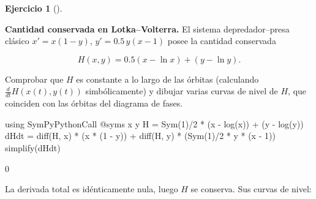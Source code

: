 \documentclass[
  spanish,
  a4paper,
]{scrreport}
\newenvironment{Shaded}{\begin{snugshade}}{\end{snugshade}}
\newcommand{\BuiltInTok}[1]{\textcolor[rgb]{0.00,0.23,0.31}{#1}}
\newcommand{\FloatTok}[1]{\textcolor[rgb]{0.68,0.00,0.00}{#1}}
\newcommand{\FunctionTok}[1]{\textcolor[rgb]{0.28,0.35,0.67}{#1}}
\newcommand{\ImportTok}[1]{\textcolor[rgb]{0.00,0.46,0.62}{#1}}
\newcommand{\NormalTok}[1]{\textcolor[rgb]{0.00,0.23,0.31}{#1}}
\newcommand{\OperatorTok}[1]{\textcolor[rgb]{0.37,0.37,0.37}{#1}}
\newcommand{\PreprocessorTok}[1]{\textcolor[rgb]{0.68,0.00,0.00}{#1}}
\theoremstyle{definition}
\newtheorem{exercise}{Ejercicio}[chapter]
\theoremstyle{remark}
\begin{document}
\begin{exercise}[]\protect\hypertarget{exr-conservado-presa}{}\label{exr-conservado-presa}

\textbf{Cantidad conservada en Lotka--Volterra.} El sistema
depredador--presa clásico \(x' = x(1-y)\), \(y' = 0.5\,y(x-1)\) posee la
cantidad conservada

\[
H(x, y) = 0.5(x - \ln x) + (y - \ln y).
\]

Comprobar que \(H\) es constante a lo largo de las órbitas (calculando
\(\frac{d}{dt}H(x(t),y(t))\) simbólicamente) y dibujar varias curvas de
nivel de \(H\), que coinciden con las órbitas del diagrama de fases.

\begin{tcolorbox}[enhanced jigsaw, arc=.35mm, bottomrule=.15mm, bottomtitle=1mm, breakable, colback=white, colbacktitle=quarto-callout-tip-color!10!white, colframe=quarto-callout-tip-color-frame, coltitle=black, left=2mm, leftrule=.75mm, opacityback=0, opacitybacktitle=0.6, rightrule=.15mm, title=\textcolor{quarto-callout-tip-color}{\faLightbulb}\hspace{0.5em}{Solución}, titlerule=0mm, toprule=.15mm, toptitle=1mm]

\begin{Shaded}
\begin{Highlighting}[]
\ImportTok{using} \BuiltInTok{SymPyPythonCall}
\PreprocessorTok{@syms}\NormalTok{ x y}
\NormalTok{H }\OperatorTok{=} \FunctionTok{Sym}\NormalTok{(}\FloatTok{1}\NormalTok{)}\OperatorTok{/}\FloatTok{2} \OperatorTok{*}\NormalTok{ (x }\OperatorTok{{-}} \FunctionTok{log}\NormalTok{(x)) }\OperatorTok{+}\NormalTok{ (y }\OperatorTok{{-}} \FunctionTok{log}\NormalTok{(y))}
\NormalTok{dHdt }\OperatorTok{=} \FunctionTok{diff}\NormalTok{(H, x) }\OperatorTok{*}\NormalTok{ (x }\OperatorTok{*}\NormalTok{ (}\FloatTok{1} \OperatorTok{{-}}\NormalTok{ y)) }\OperatorTok{+} \FunctionTok{diff}\NormalTok{(H, y) }\OperatorTok{*}\NormalTok{ (}\FunctionTok{Sym}\NormalTok{(}\FloatTok{1}\NormalTok{)}\OperatorTok{/}\FloatTok{2} \OperatorTok{*}\NormalTok{ y }\OperatorTok{*}\NormalTok{ (x }\OperatorTok{{-}} \FloatTok{1}\NormalTok{))}
\FunctionTok{simplify}\NormalTok{(dHdt)}
\end{Highlighting}
\end{Shaded}

$0$

La derivada total es idénticamente nula, luego \(H\) se conserva. Sus
curvas de nivel:


\end{tcolorbox}
\end{exercise}
\end{document}
